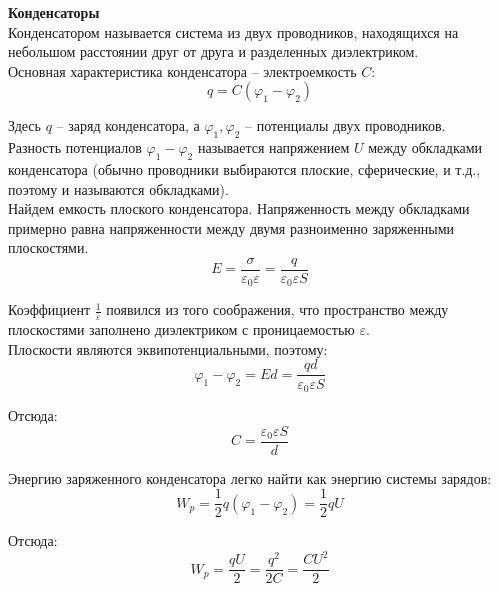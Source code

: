 \documentclass{article}
\begin{document}
	
	\textbf{Конденсаторы}\\

	Конденсатором называется система из двух проводников, находящихся на небольшом расстоянии друг от друга и разделенных диэлектриком.\\

	Основная характеристика конденсатора -- электроемкость $C$:
	\begin{equation}
		q = C(\varphi_1-\varphi_2)
	\end{equation}

	Здесь $q$ -- заряд конденсатора, а $\varphi_1, \varphi_2$ -- потенциалы двух проводников.\\

	Разность потенциалов $\varphi_1 - \varphi_2$ называется напряжением $U$ между обкладками конденсатора (обычно проводники выбираются плоские, сферические, и т.д., поэтому и называются обкладками).\\

	Найдем емкость плоского конденсатора. Напряженность между обкладками примерно равна напряженности между двумя разноименно заряженными плоскостями.
	\begin{equation}
		E = \frac{\sigma}{\varepsilon_0\varepsilon} = \frac{q}{\varepsilon_0\varepsilon S}
	\end{equation}

	Коэффициент $\frac{1}{\varepsilon}$ появился из того соображения, что пространство между плоскостями заполнено диэлектриком с проницаемостью $\varepsilon$.\\

	Плоскости являются эквипотенциальными, поэтому:
	\begin{equation}
		\varphi_1-\varphi_2 = Ed = \frac{qd}{\varepsilon_0\varepsilon S}
	\end{equation}

	Отсюда:
	\begin{equation}
		C = \frac{\varepsilon_0\varepsilon S}{d}
	\end{equation}

	Энергию заряженного конденсатора легко найти как энергию системы зарядов:
	\begin{equation}
		W_p = \frac{1}{2}q(\varphi_1-\varphi_2) = \frac{1}{2}qU
	\end{equation}

	Отсюда:
	\begin{equation}
		W_p = \frac{qU}{2} = \frac{q^2}{2C} = \frac{CU^2}{2}
	\end{equation}
\end{document}
